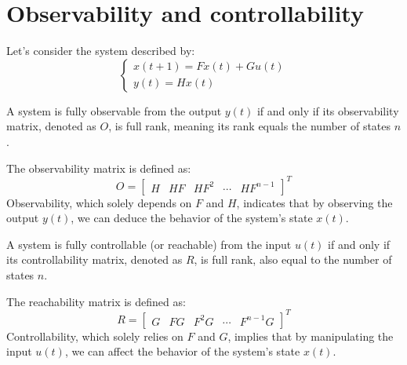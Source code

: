 \section{Observability and controllability}

Let's consider the system described by:
\[\begin{cases} x(t+1)=Fx(t)+Gu(t) \\ y(t)=Hx(t) \end{cases}\]
\begin{definition}
    A system is fully observable from the output $y(t)$ if and only if its observability matrix, denoted as $O$, is full rank, meaning its rank equals the number of states $n$.
\end{definition}
The observability matrix is defined as: 
\[O=\begin{bmatrix} H & HF & HF^2 & \cdots & HF^{n-1} \end{bmatrix}^T\]
Observability, which solely depends on $F$ and $H$, indicates that by observing the output $y(t)$, we can deduce the behavior of the system's state $x(t)$. 

\begin{definition}
    A system is fully controllable (or reachable) from the input $u(t)$ if and only if its controllability matrix, denoted as $R$, is full rank, also equal to the number of states $n$.
\end{definition}
The reachability matrix is defined as: 
\[R=\begin{bmatrix} G & FG & F^2G & \cdots & F^{n-1}G \end{bmatrix}^T\]
Controllability, which solely relies on $F$ and $G$, implies that by manipulating the input $u(t)$, we can affect the behavior of the system's state $x(t)$. 

